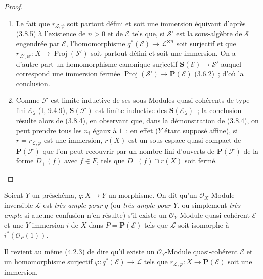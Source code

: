 \begin{proof}
\begin{enumerate}
  \item[\rm{(i)}] Le fait que $r_{\mathcal{L},\psi}$ soit partout défini et
  soit une immersion équivaut d'après
  (\hyperref[II.3.8.5-fr]{3.8.5}) à l'existence de $n>0$ et de
  $\mathcal{E}$ tels que, si $\mathcal{S}'$ est la sous-algèbre de
  $\mathcal{S}$ engendrée par $\mathcal{E}$, l'homomorphisme
  $q^*(\mathcal{E})\to\mathcal{L}^{\otimes n}$ soit surjectif et que
  $r_{\mathcal{L}',\psi'}:X\to\operatorname{Proj}(\mathcal{S}')$ soit partout
  défini et soit une immersion. On a d'autre part un homomorphisme canonique
  surjectif $\mathbf{S}(\mathcal{E})\to\mathcal{S}'$ auquel correspond une
  immersion fermée
  $\operatorname{Proj}(\mathcal{S}')\to\mathbf{P}(\mathcal{E})$
  (\hyperref[II.3.6.2-fr]{3.6.2})~; d'où la conclusion.
  \item[\rm{(ii)}] Comme $\mathcal{F}$ est limite inductive de ses
  sous-Modules quasi-cohérents de type fini $\mathcal{E}_\lambda$
  (\hyperref[I.9.4.9-fr]{I, 9.4.9}), $\mathbf{S}(\mathcal{F})$ est limite
  inductive des $\mathbf{S}(\mathcal{E}_\lambda)$~; la conclusion résulte
  alors de (\hyperref[II.3.8.4-fr]{3.8.4}), en observant que, dans la
  démonstration de (\hyperref[II.3.8.4-fr]{3.8.4}), on peut prendre tous les
  $n_i$ égaux à $1$~: en effet ($Y$ étant supposé affine), si
  $r=r_{\mathcal{L},\varphi}$ est une immersion, $r(X)$ est un sous-espace
  quasi-compact de $\mathbf{P}(\mathcal{F})$ que l'on peut recouvrir par un
  nombre fini d'ouverts de $\mathbf{P}(\mathcal{F})$ de la forme $D_+(f)$ avec
  $f\in F$, tels que $D_+(f)\cap r(X)$ soit fermé.
\end{enumerate}
\end{proof}

\begin{definition}[4.4.2]
\label{II.4.4.2-fr}
Soient $Y$ un préschéma, $q:X\to Y$ un morphisme. On dit qu'un
$\mathcal{O}_X$-Module inversible $\mathcal{L}$ est \emph{très ample pour
$q$} (ou \emph{très ample pour $Y$}, ou simplement \emph{très ample} si
aucune confusion n'en résulte) s'il existe un $\mathcal{O}_Y$-Module
quasi-cohérent $\mathcal{E}$ et une $Y$-immersion $i$ de $X$ dans
$P=\mathbf{P}(\mathcal{E})$ tels que $\mathcal{L}$ soit isomorphe à
$i^*(\mathcal{O}_P(1))$.
\end{definition}

Il revient au même (\hyperref[II.4.2.3-fr]{4.2.3}) de dire qu'il existe un
$\mathcal{O}_Y$-Module quasi-cohérent $\mathcal{E}$ et un homomorphisme
surjectif $\varphi:q^*(\mathcal{E})\to\mathcal{L}$ tels que
$r_{\mathcal{L},\varphi}:X\to\mathbf{P}(\mathcal{E})$ soit une immersion.


